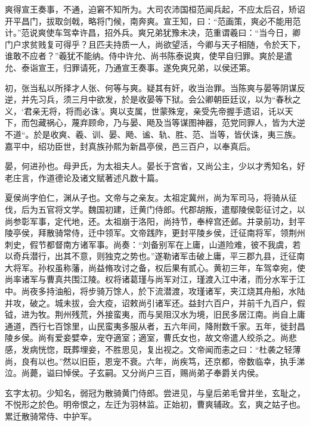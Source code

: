 \documentclass[12pt,UTF8]{ctexbook}
\begin{document}
爽得宣王奏事，不通，迫窘不知所为。大司农沛国桓范闻兵起，不应太后召，矫诏开平昌门，拔取剑戟，略将门候，南奔爽。宣王知，曰：“范画策，爽必不能用范计。”范说爽使车驾幸许昌，招外兵。爽兄弟犹豫未决，范重谓羲曰：“当今日，卿门户求贫贱复可得乎？且匹夫持质一人，尚欲望活，今卿与天子相随，令於天下，谁敢不应者？”羲犹不能纳。侍中许允、尚书陈泰说爽，使早自归罪。爽於是遣允、泰诣宣王，归罪请死，乃通宣王奏事。遂免爽兄弟，以侯还第。

初，张当私以所择才人张、何等与爽。疑其有奸，收当治罪。当陈爽与晏等阴谋反逆，并先习兵，须三月中欲发，於是收晏等下狱。会公卿朝臣廷议，以为“春秋之义，‘君亲无将，将而必诛’。爽以支属，世蒙殊宠，亲受先帝握手遗诏，讬以天下，而包藏祸心，蔑弃顾命，乃与晏、飏及当等谋图神器，范党同罪人，皆为大逆不道“。於是收爽、羲、训、晏、飏、谧、轨、胜、范、当等，皆伏诛，夷三族。嘉平中，绍功臣世，封真族孙熙为新昌亭侯，邑三百户，以奉真后。

晏，何进孙也。母尹氏，为太祖夫人。晏长于宫省，又尚公主，少以才秀知名，好老庄言，作道德论及诸文赋著述凡数十篇。

夏侯尚字伯仁，渊从子也。文帝与之亲友。太祖定冀州，尚为军司马，将骑从征伐，后为五官将文学。魏国初建，迁黄门侍郎。代郡胡叛，遣鄢陵侯彰征讨之，以尚参彰军事，定代地，还。太祖崩于洛阳，尚持节，奉梓宫还邺。并录前功，封平陵亭侯，拜散骑常侍，迁中领军。文帝践阼，更封平陵乡侯，迁征南将军，领荆州刺史，假节都督南方诸军事。尚奏：“刘备别军在上庸，山道险难，彼不我虞，若以奇兵潜行，出其不意，则独克之势也。”遂勒诸军击破上庸，平三郡九县，迁征南大将军。孙权虽称藩，尚益脩攻讨之备，权后果有贰心。黄初三年，车驾幸宛，使尚率诸军与曹真共围江陵。权将诸葛瑾与尚军对江，瑾渡入江中渚，而分水军于江中。尚夜多持油船，将步骑万馀人，於下流潜渡，攻瑾诸军，夹江烧其舟船，水陆并攻，破之。城未拔，会大疫，诏敕尚引诸军还。益封六百户，并前千九百户，假钺，进为牧。荆州残荒，外接蛮夷，而与吴阻汉水为境，旧民多居江南。尚自上庸通道，西行七百馀里，山民蛮夷多服从者，五六年间，降附数千家。五年，徙封昌陵乡侯。尚有爱妾嬖幸，宠夺適室；適室，曹氏女也，故文帝遣人绞杀之。尚悲感，发病恍惚，既葬埋妾，不胜思见，复出视之。文帝闻而恚之曰：“杜袭之轻薄尚，良有以也。”然以旧臣，恩宠不衰。六年，尚疾笃，还京都，帝数临幸，执手涕泣。尚薨，谥曰悼侯。子玄嗣。又分尚户三百，赐尚弟子奉爵关内侯。

玄字太初。少知名，弱冠为散骑黄门侍郎。尝进见，与皇后弟毛曾并坐，玄耻之，不悦形之於色。明帝恨之，左迁为羽林监。正始初，曹爽辅政。玄，爽之姑子也。累迁散骑常侍、中护军。
\end{document}
